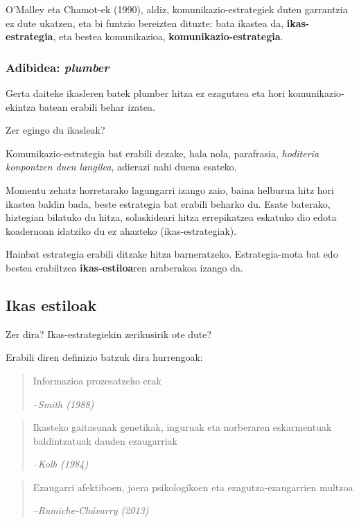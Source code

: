 \documentclass[]{book}
\begin{document}
O'Malley eta Chamot-ek (1990), aldiz, komunikazio-estrategiek duten garrantzia ez dute ukatzen, eta bi funtzio bereizten dituzte: bata ikastea da, \textbf{ikas-estrategia}, eta bestea komunikazioa, \textbf{komunikazio-estrategia}.

\hypertarget{adibidea-plumber}{%
\subsubsection{\texorpdfstring{Adibidea: \emph{plumber}}{Adibidea: plumber}}\label{adibidea-plumber}}

Gerta daiteke ikasleren batek plumber hitza ez ezagutzea eta hori komunikazio-ekintza batean erabili behar izatea.

Zer egingo du ikasleak?

Komunikazio-estrategia bat erabili dezake, hala nola, parafrasia, \emph{hoditeria konpontzen duen langilea}, adierazi nahi duena esateko.

Momentu zehatz horretarako lagungarri izango zaio, baina helburua hitz hori ikastea baldin bada, beste estrategia bat erabili beharko du. Esate baterako, hiztegian bilatuko du hitza, solaskideari hitza errepikatzea eskatuko dio edota koadernoan idatziko du ez ahazteko (ikas-estrategiak).

Hainbat estrategia erabili ditzake hitza barneratzeko. Estrategia-mota bat edo bestea erabiltzea \textbf{ikas-estiloa}ren araberakoa izango da.

\hypertarget{ikas-estiloak}{%
\subsection{Ikas estiloak}\label{ikas-estiloak}}

Zer dira? Ikas-estrategiekin zerikusirik ote dute?

Erabili diren definizio batzuk dira hurrengoak:

\begin{quote}
Informazioa prozesatzeko erak

--\emph{Smith (1988)}
\end{quote}

\begin{quote}
Ikasteko gaitasunak genetikak, inguruak eta norberaren eskarmentuak baldintzatuak dauden ezaugarriak

--\emph{Kolb (1984)}
\end{quote}

\begin{quote}
Ezaugarri afektiboen, joera psikologikoen eta ezagutza-ezaugarrien multzoa

--\emph{Rumiche-Chávarry (2013)}
\end{quote}
\end{document}
